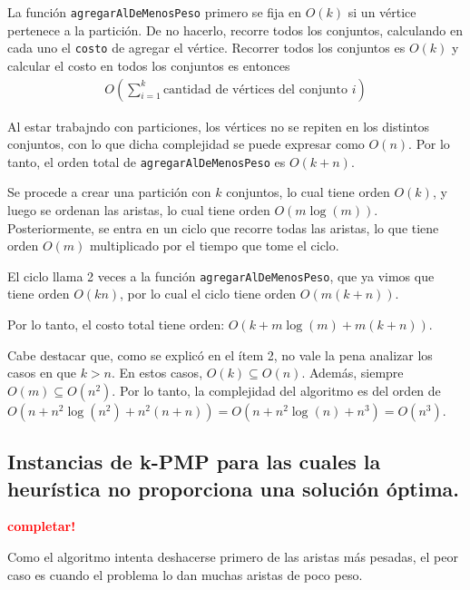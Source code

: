 La función \texttt{agregarAlDeMenosPeso} primero se fija en $O(k)$ si un
vértice pertenece a la partición. De no hacerlo, recorre todos los conjuntos,
calculando en cada uno el \texttt{costo} de agregar el vértice. Recorrer todos
los conjuntos es $O(k)$ y calcular el costo en todos los conjuntos es entonces
\begin{align*}
  O(\sum_{i=1}^k \text{cantidad de vértices del conjunto } i)
\end{align*}

Al estar trabajndo con particiones, los vértices no se repiten en los distintos
conjuntos, con lo que dicha complejidad se puede expresar como $O(n)$. Por lo
tanto, el orden total de \texttt{agregarAlDeMenosPeso} es $O(k + n)$.

Se procede a crear una partición con $k$ conjuntos, lo cual tiene orden $O(k)$,
y luego se ordenan las aristas, lo cual tiene orden $O(m\log(m))$.
Posteriormente, se entra en un ciclo que recorre todas las aristas, lo que tiene
orden $O(m)$ multiplicado por el tiempo que tome el ciclo.

El ciclo llama 2 veces a la función \texttt{agregarAlDeMenosPeso}, que ya vimos
que tiene orden $O(kn)$, por lo cual el ciclo tiene orden $O(m(k + n))$.

Por lo tanto, el costo total tiene orden: $O(k + m\log(m) + m(k + n))$.

Cabe destacar que, como se explicó en el ítem 2, no vale la pena analizar los
casos en que $k > n$. En estos casos, $O(k) \subseteq O(n)$. Además, siempre
$O(m) \subseteq O(n^2)$. Por lo tanto, la complejidad del algoritmo es del
orden de $O(n + n^2 \log(n^2) + n^2 (n + n)) = O(n + n^2 \log(n) + n^3) =
O(n^3)$.

\newpage
\subsection{Instancias de k-PMP para las cuales la heurística no proporciona
            una solución óptima.}
\vspace*{0.3cm}
\textcolor{red}{\textbf{completar!}}

Como el algoritmo intenta deshacerse primero de las aristas más pesadas, el
peor caso es cuando el problema lo dan muchas aristas de poco peso.

